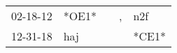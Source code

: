 \begin{supertabular}{p{0.07\textwidth}p{0.06\textwidth}p{0.02\textwidth}p{0.02\textwidth}p{0.06\textwidth}}
 02-18-12\textsuperscript{} &                  *OE1* &   &  , &  n2f\textsuperscript{} \\
 12-31-18\textsuperscript{} &  haj\textsuperscript{} &   &    &                  *CE1* \\
\end{supertabular}
